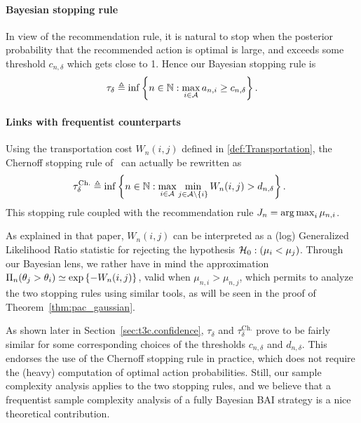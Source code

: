 \paragraph{Bayesian stopping rule}
In view of the recommendation rule, it is natural to stop when the posterior probability that the recommended action is optimal is large, and exceeds some threshold $c_{n,\delta}$ which gets close to 1. Hence our Bayesian stopping rule is \begin{equation}\label{eq:stopping}
    \tau_{\delta} \triangleq \inf \left\{ n\in{\mathbb N}:\max_{i\in\mathcal{A}} a_{n,i} \geq c_{n,\delta} \right\}.
\end{equation}

\paragraph{Links with frequentist counterparts} Using the transportation cost $W_n(i,j)$ defined in \eqref{def:Transportation}, the Chernoff stopping rule of~\cite{garivier2016tracknstop} can actually be rewritten as
\begin{equation}\label{eq:chernoffstoppingtime}
\hspace{-0.2cm}\tau_\delta^{\text{Ch.}} \eqdef \inf \left\lbrace n \in \mathbb{N} : \max_{i \in \cA} \min_{j \in \cA \setminus \{i\} } W_{n}(i,j) > d_{n,\delta} \right\rbrace.
\end{equation}
This stopping rule coupled with the recommendation rule $J_n = \operatorname*{arg\,max}_{i} \mu_{n,i}$. 

As explained in that paper, $W_{n}(i,j)$ can be interpreted as a (log) Generalized Likelihood Ratio statistic for rejecting the hypothesis $\mathcal{H}_0 : (\mu_i < \mu_j)$. Through our Bayesian lens, we rather have in mind the approximation $\Pi_n(\theta_j > \theta_i) \simeq \exp\left\{-W_n(i,j)\right\}$, valid when $\mu_{n,i}> \mu_{n,j}$, which permits to analyze the two stopping rules using similar tools, as will be seen in the proof of Theorem~\ref{thm:pac_gaussian}. 

As shown later in Section~\ref{sec:t3c.confidence}, $\tau_\delta$ and $\tau_\delta^{\text{Ch.}}$ prove to be fairly similar for some corresponding choices of the thresholds $c_{n,\delta}$ and $d_{n,\delta}$. This endorses the use of the Chernoff stopping rule in practice, which does not require the (heavy) computation of optimal action probabilities. Still, our sample complexity analysis applies to the two stopping rules, and we believe that a frequentist sample complexity analysis of a fully Bayesian BAI strategy is a nice theoretical contribution.

